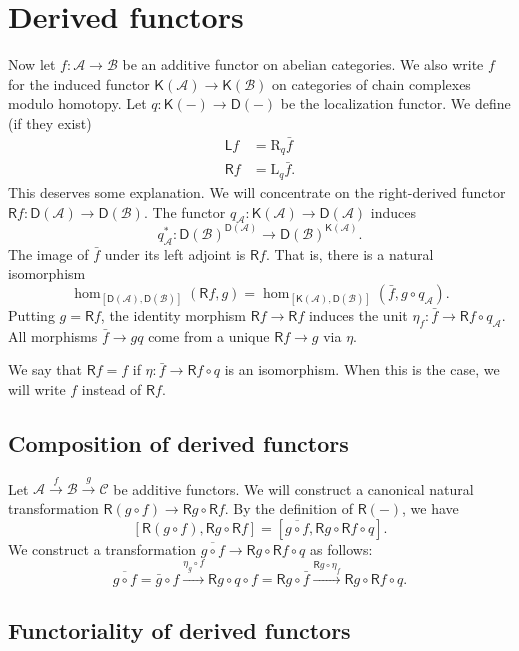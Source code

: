 \documentclass{amsart}
\newcommand{\cA}{\mathcal{A}}
\newcommand{\cB}{\mathcal{B}}
\newcommand{\cC}{\mathcal{C}}
\newcommand{\eD}{\mathsf{D}}
\newcommand{\eK}{\mathsf{K}}
\newcommand{\eL}{\mathsf{L}}
\newcommand{\eR}{\mathsf{R}}
\newcommand{\lan}{\mathrm{L}}
\newcommand{\ran}{\mathrm{R}}
\begin{document}
\section{Derived functors}

Now let $f:\cA\to \cB$ be an additive functor on abelian categories. We also 
write $f$ for the induced functor $\eK(\cA) \to \eK(\cB)$ on categories of 
chain complexes modulo homotopy. Let $q:\eK(-)\to \eD(-)$ be the localization 
functor. We define (if they exist) 
\begin{align*}
  \eL f &= \ran_q\bar f \\
  \eR f &= \lan_q \bar f .
\end{align*}
This deserves some explanation. We will concentrate on the right-derived 
functor $\eR f:\eD(\cA) \to \eD(\cB)$. The functor 
$q_\cA:\eK(\cA) \to \eD(\cA)$ induces 
\[
  q_\cA^\ast:\eD(\cB)^{\eD(\cA)} \to \eD(\cB)^{\eK(\cA)} .
\]
The image of $\bar f$ under its left adjoint is $\eR f$. That is, there is a 
natural isomorphism 
\[
  \hom_{[\eD(\cA),\eD(\cB)]}(\eR f,g) = \hom_{[\eK(\cA),\eD(\cB)]}(\bar f, g\circ q_\cA) .
\]
Putting $g=\eR f$, the identity morphism $\eR f\to \eR f$ induces 
the unit $\eta_f:\bar f\to \eR f\circ q_\cA$. All morphisms 
$\bar f\to gq$ come from a unique $\eR f\to g$ via $\eta$. 

We say that $\eR f=f$ if $\eta:\bar f\to \eR f\circ q$ is an isomorphism. When 
this is the case, we will write $f$ instead of $\eR f$. 


\subsection{Composition of derived functors}

Let $\cA\xrightarrow f \cB\xrightarrow g \cC$ be additive functors. We will 
construct a canonical natural transformation 
$\eR(g\circ f) \to \eR g\circ \eR f$. By the definition of $\eR(-)$, we have 
\[
  [\eR(g\circ f),\eR g\circ \eR f] = [\overline{g\circ f},\eR g\circ \eR f\circ q] .
\]
We construct a transformation $\overline{g\circ f}\to\eR g\circ \eR f\circ q$ 
as follows:
\[
  \overline{g\circ f} = \bar g\circ f\xrightarrow{\eta_g\circ f} \eR g\circ q \circ f = \eR g\circ \bar f \xrightarrow{\eR g\circ \eta_f} \eR g\circ \eR f\circ q .
\]



\subsection{Functoriality of derived functors}
\end{document}

